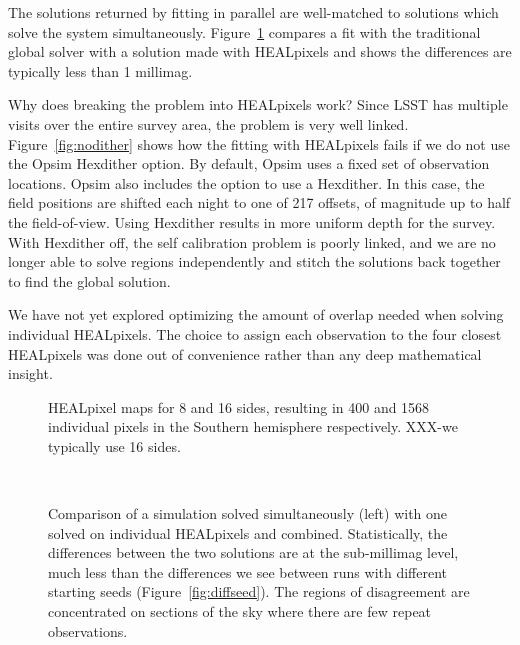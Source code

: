\documentclass[12pt,preprint]{aastex}
\begin{document}
The solutions returned by fitting in parallel are well-matched to solutions which solve the system simultaneously.  Figure~\ref{fig:hpvglobal} compares a fit with the traditional global solver with a solution made with HEALpixels and shows the differences are typically less than 1 millimag.  





Why does breaking the problem into HEALpixels work?  Since LSST has multiple visits over the entire survey area, the problem is very well linked.  Figure~\ref{fig:nodither} shows how the fitting with HEALpixels fails if we do not use the Opsim Hexdither option.  By default, Opsim uses a fixed set of observation locations.  Opsim also includes the option to use a Hexdither.  In this case, the field positions are shifted each night to one of 217 offsets, of magnitude up to half the field-of-view.  Using Hexdither results in more uniform depth for the survey.  With Hexdither off, the self calibration problem is poorly linked, and we are no longer able to solve regions independently and stitch the solutions back together to find the global solution.  

We have not yet explored optimizing the amount of overlap needed when solving individual HEALpixels.   The choice to assign each observation to the four closest HEALpixels was done out of convenience rather than any deep mathematical insight.  


\begin{figure}
\caption{HEALpixel maps for 8 and 16 sides, resulting in 400 and 1568 individual pixels in the Southern hemisphere respectively.  XXX-we typically use 16 sides.}
\end{figure}


\begin{figure}
 \\
\caption{Comparison of a simulation solved simultaneously (left) with one solved on individual HEALpixels and combined.  Statistically, the differences between the two solutions are at the sub-millimag level, much less than the differences we see between runs with different starting seeds (Figure~\ref{fig:diffseed}). The regions of disagreement are concentrated on sections of the sky where there are few repeat observations.  \label{fig:hpvglobal}}
\end{figure}
\end{document}
